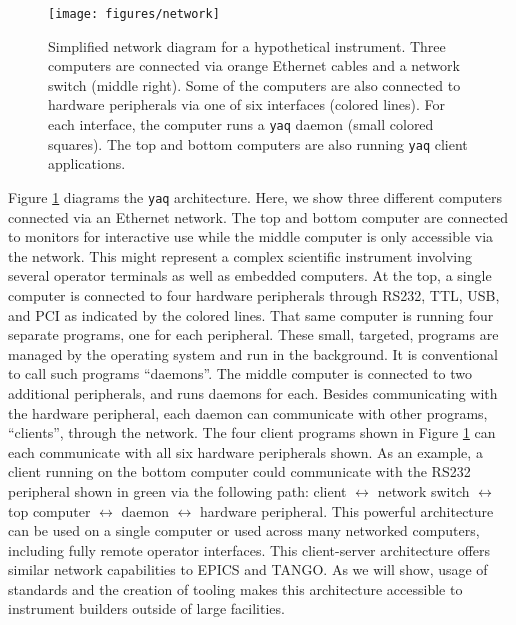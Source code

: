 \documentclass[aip, amsmath, amssymb, reprint,]{revtex4-2}
\newcommand\yaq{\texttt{yaq}}
\begin{document}
\begin{figure}
    \texttt{[image: figures/network]}
    \caption{\label{fig:network} Simplified network diagram for a hypothetical instrument. Three computers are connected via orange Ethernet cables and a network switch (middle right). Some of the computers are also connected to hardware peripherals via one of six interfaces (colored lines). For each interface, the computer runs a \yaq{} daemon (small colored squares). The top and bottom computers are also running \yaq{} client applications.}
\end{figure}

Figure \ref{fig:network} diagrams the \yaq{} architecture.
Here, we show three different computers connected via an Ethernet network.
The top and bottom computer are connected to monitors for interactive use while the middle computer is only accessible via the network.
This might represent a complex scientific instrument involving several operator terminals as well as embedded computers.
At the top, a single computer is connected to four hardware peripherals through RS232, TTL, USB, and PCI as indicated by the colored lines.
That same computer is running four separate programs, one for each peripheral.
These small, targeted, programs are managed by the operating system and run in the background.
It is conventional to call such programs ``daemons''\cite{Raymond_1996}.
The middle computer is connected to two additional peripherals, and runs daemons for each.
Besides communicating with the hardware peripheral, each daemon can communicate with other programs, ``clients'',  through the network.
The four client programs shown in Figure \ref{fig:network} can each communicate with all six hardware peripherals shown.
As an example, a client running on the bottom computer could communicate with the RS232 peripheral shown in green via the following path: client $\leftrightarrow$ network switch $\leftrightarrow$ top computer $\leftrightarrow$ daemon $\leftrightarrow$ hardware peripheral.
This powerful architecture can be used on a single computer or used across many networked computers, including fully remote operator interfaces.
This client-server architecture offers similar network capabilities to EPICS and TANGO.
As we will show, usage of standards and the creation of tooling makes this architecture accessible to instrument builders outside of large facilities.
\end{document}
